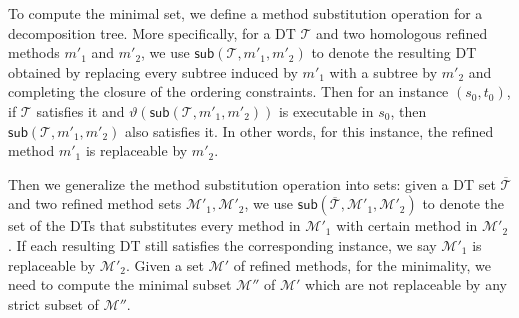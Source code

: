 \documentclass[letterpaper]{article} %
\newcommand{\HtnDomain}{\mathfrak{D}}
\newcommand{\Methods}{\mathcal{M}}
\newcommand{\Dtree}{\mathcal{T}}
\newcommand{\yield}{\vartheta}
\newcommand{\Instances}{\mathcal{I}}
\begin{document}
To compute the minimal set, we define a method substitution operation for a decomposition tree.
More specifically, for a DT $\Dtree$ and two homologous refined methods $m'_1$ and $m'_2$, we use $\mathsf{sub}(\Dtree,m'_1,m'_2)$ to denote the resulting DT obtained by replacing every subtree induced by $m'_1$ with a subtree by $m'_2$ and completing the closure of the ordering constraints.
Then for an instance $(s_0,t_0)$, if $\Dtree$ satisfies it and $\yield(\mathsf{sub}(\Dtree,m'_1,m'_2))$ is executable in $s_0$, then $\mathsf{sub}(\Dtree,m'_1,m'_2)$ also satisfies it.
In other words, for this instance, the refined method $m'_1$ is replaceable by $m'_2$.

Then we generalize the method substitution operation into sets:
given a DT set $\overline{\Dtree}$ and two refined method sets $\Methods'_1,\Methods'_2$,
we use $\mathsf{sub}(\overline{\Dtree},\Methods'_1,\Methods'_2)$ to denote the set of the DTs that substitutes every method in $\Methods'_1$ with certain method in $\Methods'_2$.
If each resulting DT still satisfies the corresponding instance, we say $\Methods'_1$ is replaceable by $\Methods'_2$.
Given a set $\Methods'$ of refined methods, for the minimality, we need to compute the minimal subset $\Methods''$ of $\Methods'$ which are not replaceable by any strict subset of $\Methods''$.

%




\end{document}
